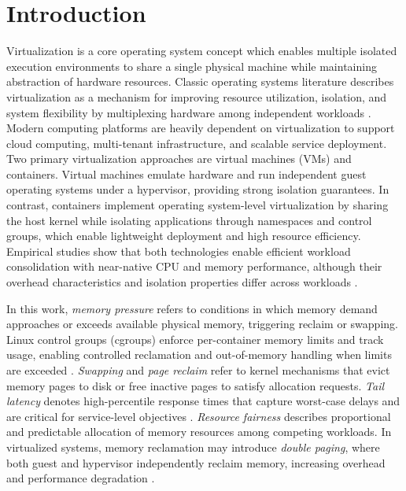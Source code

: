 \documentclass[conference]{IEEEtran}
\begin{document}
\section{Introduction}

Virtualization is a core operating system concept which enables multiple isolated execution environments to share a single physical machine while maintaining abstraction of hardware resources. Classic operating systems literature describes virtualization as a mechanism for improving resource utilization, isolation, and system flexibility by multiplexing hardware among independent workloads \cite{silberschatz2018operating}. Modern computing platforms are heavily dependent on virtualization to support cloud computing, multi-tenant infrastructure, and scalable service deployment. Two primary virtualization approaches are virtual machines (VMs) and containers. Virtual machines emulate hardware and run independent guest operating systems under a hypervisor, providing strong isolation guarantees. In contrast, containers implement operating system-level virtualization by sharing the host kernel while isolating applications through namespaces and control groups, which enable lightweight deployment and high resource efficiency. Empirical studies show that both technologies enable efficient workload consolidation with near-native CPU and memory performance, although their overhead characteristics and isolation properties differ across workloads \cite{felter2015comparison}.

In this work, \textit{memory pressure} refers to conditions in which memory demand approaches or exceeds available physical memory, triggering reclaim or swapping. Linux control groups (cgroups) enforce per-container memory limits and track usage, enabling controlled reclamation and out-of-memory handling when limits are exceeded \cite{linux_cgroup_memory_controller}. \textit{Swapping} and \textit{page reclaim} refer to kernel mechanisms that evict memory pages to disk or free inactive pages to satisfy allocation requests. \textit{Tail latency} denotes high-percentile response times that capture worst-case delays and are critical for service-level objectives \cite{dean2013tail}. \textit{Resource fairness} describes proportional and predictable allocation of memory resources among competing workloads. In virtualized systems, memory reclamation may introduce \textit{double paging}, where both guest and hypervisor independently reclaim memory, increasing overhead and performance degradation \cite{WaldspurgerProceedingsOT}.
\end{document}
